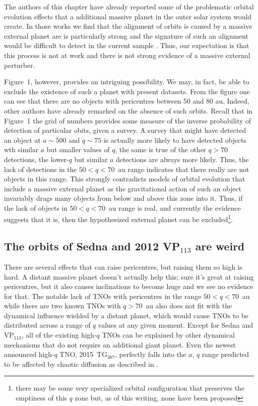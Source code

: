 \documentclass{aastex62}
\begin{document}
The authors of this chapter have already reported some of the problematic orbital evolution effects that a additional massive planet in the outer solar system would create.  In  those works we find that the alignment of orbits is caused by a massive external planet are is particularly strong \citep{shankman17}  and the signature of such an alignment would be difficult to detect in the current sample \citep{lawler2017}.  Thus, our expectation is that this process is not at work and there is not strong evidence of a massive external perturber.

Figure~1, however, provides an intriguing possibility.  We may, in fact, be able to exclude the existence of such a planet with present datasets. From the figure one can see that there are no objects with pericentres between 50 and 80 au.  Indeed, other authors have already remarked on the absence of such orbits.  Recall that in Figure~1 the grid of numbers provides some measure of the inverse probability of detection of particular obits, given a survey.  A survey that might have detected an object at $a \sim 500$ and $q \sim75$ is actually more likely to have detected objects wth similar $a$ but smaller values of $q$, the same is true of the other $q>70$ detections, the lower-$q$ but similar $a$ detections are always more likely.  Thus, the lack of detections in the $50 < q < 70$~au range indicates that there really are not objects in this range.  This strongly contradicts models of orbital evolution that include a massive external planet as the gravitational action of such an object invariably drags many objects from below and above this zone into it.  Thus, if the lack of objects in $50 < q < 70$~au range is real, and currently the evidence suggests that it is, then the hypothesized external planet can be excluded\footnote{there may be some very specialized orbital configuration that preserves the emptiness of this  $q$ zone but, as of this writing, none have been proposed}.


\subsection{The orbits of Sedna and 2012 VP$_{113}$ are weird}

There are several effects that can raise pericentres, but raising them
so high is hard.  A distant massive planet doesn't actually help this; sure it's great
at raising pericentres, but it also causes inclinations to become huge
and we see no evidence for that.  The notable lack of TNOs with pericentres in the range $50<q<70$~au while there are two known TNOs with $q>70$~au also does not fit with 
the dynamical influence wielded by a distant planet, which would cause TNOs to be distributed across a range of $q$ values at any given moment.
Except for Sedna and VP$_{113}$, all
of the existing high-$q$ TNOs can be explained by other dynamical
mechanisms that do not require an additional giant planet.  Even the
newest announced high-$q$ TNO, 2015~TG$_{387}$, perfectly falls into
the $a$, $q$ range predicted to be affected by chaotic diffusion as
described in \citet{bannister17}.
\end{document}
